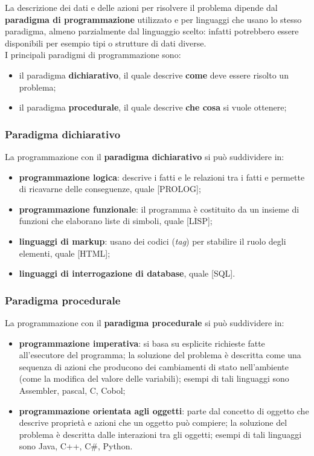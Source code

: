 \documentclass[a4paper]{extarticle}
\begin{document}
\vspace{1em}
\noindent
La  descrizione  dei  dati  e  delle  azioni  per risolvere il problema dipende dal \textbf{paradigma di programmazione} utilizzato e per linguaggi che  usano  lo  stesso  paradigma,  almeno parzialmente  dal  linguaggio  scelto: infatti potrebbero essere disponibili per esempio tipi o strutture di dati diverse.\\
I principali paradigmi di programmazione sono:
\begin{itemize}
  \item il paradigma \textbf{dichiarativo}, il quale descrive \textbf{come} deve essere risolto un problema;
  \item il paradigma \textbf{procedurale}, il quale descrive \textbf{che cosa} si vuole ottenere;
\end{itemize}

\vspace{1em}
\subsubsection{Paradigma dichiarativo}
La programmazione con il \textbf{paradigma dichiarativo} si può suddividere in:
\begin{itemize}
  \item \textbf{programmazione logica}: descrive i fatti e le relazioni tra i fatti e permette di ricavarne delle conseguenze, quale [PROLOG];
  \item \textbf{programmazione funzionale}: il programma è costituito da un insieme di funzioni che elaborano liste di simboli, quale [LISP];
  \item \textbf{linguaggi di markup}: usano dei codici (\emph{tag}) per stabilire il ruolo degli elementi, quale [HTML];
  \item \textbf{linguaggi di interrogazione di database}, quale [SQL].
\end{itemize}

\vspace{1em}
\subsubsection{Paradigma procedurale}
La programmazione con il \textbf{paradigma procedurale} si può suddividere in:
\begin{itemize}
  \item \textbf{programmazione imperativa}: si basa su esplicite richieste fatte all’esecutore del programma; la soluzione del problema è descritta come una sequenza di azioni che producono dei cambiamenti di stato nell’ambiente (come la modifica del valore delle variabili); esempi di tali linguaggi sono Assembler, pascal, C, Cobol;
  \item \textbf{programmazione orientata agli oggetti}: parte dal concetto di oggetto che descrive proprietà e azioni che un oggetto può compiere; la soluzione del problema è descritta dalle interazioni tra gli oggetti; esempi di tali linguaggi sono Java, C++, C\#, Python.
\end{itemize}
\end{document}
